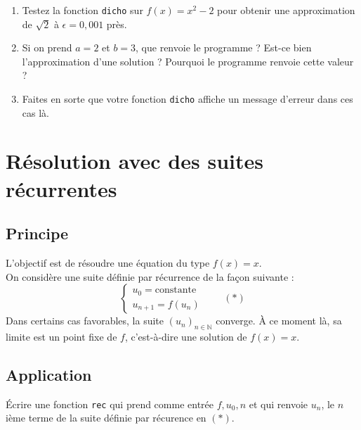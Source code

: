 \begin{exercice}
\begin{enumerate}
\item Testez la fonction \verb?dicho? sur $f(x)=x^2-2$ pour obtenir une approximation de $\sqrt{2}$ \` a $\epsilon=0,001$ pr\` es.
\item Si on prend $a=2$ et $b=3$, que renvoie le programme ? Est-ce bien l'approximation d'une solution ? Pourquoi le programme renvoie cette valeur ? 
\item Faites en sorte que votre fonction \verb?dicho? affiche un message d'erreur dans ces cas l\` a.
\end{enumerate}
\end{exercice}


\section{R\' esolution avec des suites r\' ecurrentes}

\subsection{Principe}
\noindent L'objectif est de r\' esoudre une \' equation du type $f(x)=x$.\\
On consid\` ere une suite d\' efinie par r\' ecurrence de la fa\c  con suivante :
\[\left\lbrace\begin{array}{l}
u_0=\text{constante}\\
u_{n+1}=f(u_n)
\end{array}\right.\qquad (*)\]
Dans certains cas favorables, la suite $(u_n)_{n\in\mathbb{N}}$ converge. \` A ce moment l\` a, sa limite est un point fixe de $f$, c'est-\` a-dire une solution de $f(x)=x$.

\subsection{Application}

\begin{exercice}
\' Ecrire une fonction \verb?rec? qui prend comme entr\' ee $f,u_0,n$ et qui renvoie $u_n$, le $n$i\` eme terme de la suite d\' efinie par r\' ecurence en $(*)$.
\end{exercice}

